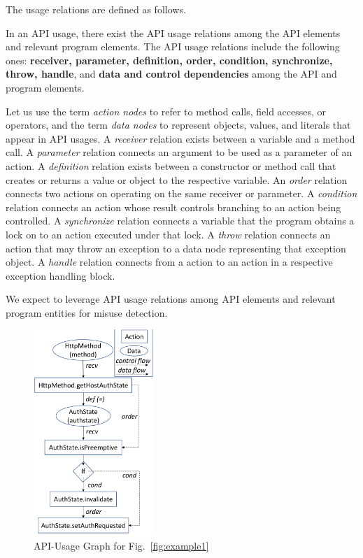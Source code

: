 The usage relations are defined as follows.

\begin{Definition}
  In an API usage, there exist the API usage relations among the API
  elements and relevant program elements. The API usage relations
  include the following ones: {\bf receiver, parameter, definition,
    order, condition, synchronize, throw, handle}, and {\bf data and
    control dependencies} among the API and program elements.
\end{Definition}

Let us use the term {\em action nodes} to refer to method calls, field
accesses, or operators, and the term {\em data nodes} to represent
objects, values, and literals that appear in API usages. A {\em
  receiver} relation exists between a variable and a method call. A
{\em parameter} relation connects an argument to be used as a
parameter of an action. A {\em definition} relation exists between a
constructor or method call that creates or returns a value or object
to the respective variable. An {\em order} relation connects two
actions on operating on the same receiver or parameter. A {\em
  condition} relation connects an action whose result controls
branching to an action being controlled. A {\em synchronize} relation
connects a variable that the program obtains a lock on to an action
executed under that lock. A {\em throw} relation connects an action
that may throw an exception to a data node representing that exception
object. A {\em handle} relation connects from a  action to
an action in a respective exception handling block.

We expect to leverage API usage relations among API elements
and relevant program entities for misuse detection.

\begin{figure}[t] %
	\centering
	\includegraphics[width=1.8in]{aug}
        \vspace{-3pt}
	\caption{API-Usage Graph for Fig.~\ref{fig:example1}}
	\label{fig:aug}
\end{figure}

